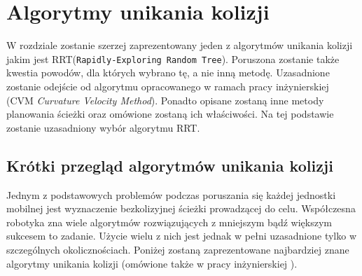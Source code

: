 \chapter{Algorytmy unikania kolizji \label{chap:algorytmy}}
 W rozdziale zostanie szerzej zaprezentowany jeden z algorytmów unikania kolizji jakim jest RRT(\texttt{Rapidly-Exploring Random Tree}).
Poruszona zostanie także kwestia powodów, dla których wybrano tę, a nie inną metodę. Uzasadnione zostanie odejście od algorytmu opracowanego w ramach pracy 
inżynierskiej (CVM \textit{Curvature Velocity Method}). Ponadto opisane zostaną inne metody planowania ścieżki oraz omówione zostaną ich właściwości. Na tej podstawie zostanie 
uzasadniony wybór algorytmu RRT.

\section{Krótki przegląd algorytmów unikania kolizji}
Jednym z podstawowych problemów podczas poruszania się każdej jednostki mobilnej jest wyznaczenie bezkolizyjnej ścieżki prowadzącej do celu.
Współczesna robotyka zna wiele algorytmów rozwiązujących z mniejszym bądź większym sukcesem to zadanie. Użycie wielu z nich jest jednak w pełni uzasadnione tylko w
szczególnych okolicznościach. Poniżej zostaną zaprezentowane najbardziej znane algorytmy unikania kolizji (omówione także w pracy inżynierskiej \cite{inzynierka}).
